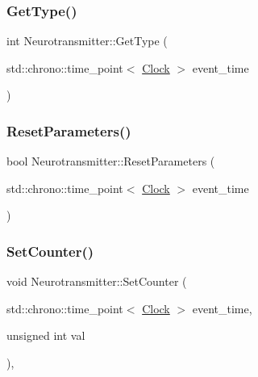 \mbox{\label{classNeurotransmitter_a45414c0d173758edbbf9318a7eccb623}} 
\subsubsection{\texorpdfstring{Get\+Type()}{GetType()}}
{\footnotesize\ttfamily int Neurotransmitter\+::\+Get\+Type (\begin{DoxyParamCaption}\item[{std\+::chrono\+::time\+\_\+point$<$ \mbox{\hyperlink{universe_8h_a0ef8d951d1ca5ab3cfaf7ab4c7a6fd80}{Clock}} $>$}]{event\+\_\+time }\end{DoxyParamCaption})\hspace{0.3cm}{\ttfamily [inline]}}

\mbox{\label{classNeurotransmitter_a6e7650d738bccfbbd49ede10970687aa}} 
\subsubsection{\texorpdfstring{Reset\+Parameters()}{ResetParameters()}}
{\footnotesize\ttfamily bool Neurotransmitter\+::\+Reset\+Parameters (\begin{DoxyParamCaption}\item[{std\+::chrono\+::time\+\_\+point$<$ \mbox{\hyperlink{universe_8h_a0ef8d951d1ca5ab3cfaf7ab4c7a6fd80}{Clock}} $>$}]{event\+\_\+time }\end{DoxyParamCaption})}

\mbox{\label{classNeurotransmitter_ae16ec051609867d4f64fad5ba4449443}} 
\subsubsection{\texorpdfstring{Set\+Counter()}{SetCounter()}}
{\footnotesize\ttfamily void Neurotransmitter\+::\+Set\+Counter (\begin{DoxyParamCaption}\item[{std\+::chrono\+::time\+\_\+point$<$ \mbox{\hyperlink{universe_8h_a0ef8d951d1ca5ab3cfaf7ab4c7a6fd80}{Clock}} $>$}]{event\+\_\+time,  }\item[{unsigned int}]{val }\end{DoxyParamCaption})\hspace{0.3cm}{\ttfamily [inline]}, {\ttfamily [virtual]}}



